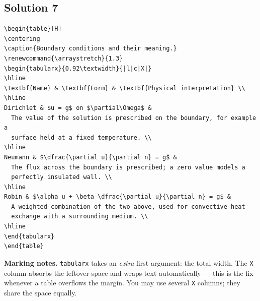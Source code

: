 \documentclass[11pt]{article}
\begin{document}
\subsection*{Solution 7}
\begin{lstlisting}[style=tex]
\begin{table}[H]
\centering
\caption{Boundary conditions and their meaning.}
\renewcommand{\arraystretch}{1.3}
\begin{tabularx}{0.92\textwidth}{|l|c|X|}
\hline
\textbf{Name} & \textbf{Form} & \textbf{Physical interpretation} \\
\hline
Dirichlet & $u = g$ on $\partial\Omega$ &
  The value of the solution is prescribed on the boundary, for example a
  surface held at a fixed temperature. \\
\hline
Neumann & $\dfrac{\partial u}{\partial n} = g$ &
  The flux across the boundary is prescribed; a zero value models a
  perfectly insulated wall. \\
\hline
Robin & $\alpha u + \beta \dfrac{\partial u}{\partial n} = g$ &
  A weighted combination of the two above, used for convective heat
  exchange with a surrounding medium. \\
\hline
\end{tabularx}
\end{table}
\end{lstlisting}
\textbf{Marking notes.} \texttt{tabularx} takes an \emph{extra} first argument:
the total width. The \texttt{X} column absorbs the leftover space and wraps
text automatically --- this is the fix whenever a table overflows the margin.
You may use several \texttt{X} columns; they share the space equally.

\end{document}
